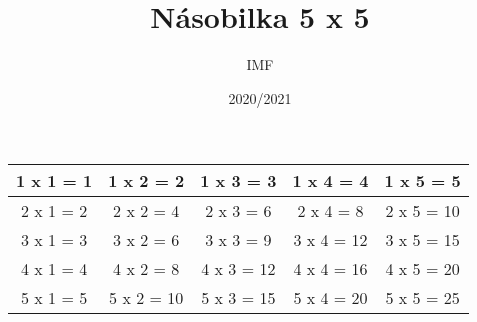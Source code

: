 \documentclass[a4paper,landscape,11pt]{article}
\title{Násobilka 5 x 5}
\author{IMF}
\date{2020/2021}
\begin{document}
\maketitle

\begin{tabular}{|c|c|c|c|c|}
  \hline
  
  
  1 x 1 = 1
  
  &
  
  
  1 x 2 = 2
  
  &
  
  
  1 x 3 = 3
  
  &
  
  
  1 x 4 = 4
  
  &
  
  
  1 x 5 = 5
  
  
  \\ \hline
  
  
  2 x 1 = 2
  
  &
  
  
  2 x 2 = 4
  
  &
  
  
  2 x 3 = 6
  
  &
  
  
  2 x 4 = 8
  
  &
  
  
  2 x 5 = 10
  
  
  \\ \hline
  
  
  3 x 1 = 3
  
  &
  
  
  3 x 2 = 6
  
  &
  
  
  3 x 3 = 9
  
  &
  
  
  3 x 4 = 12
  
  &
  
  
  3 x 5 = 15
  
  
  \\ \hline
  
  
  4 x 1 = 4
  
  &
  
  
  4 x 2 = 8
  
  &
  
  
  4 x 3 = 12
  
  &
  
  
  4 x 4 = 16
  
  &
  
  
  4 x 5 = 20
  
  
  \\ \hline
  
  
  5 x 1 = 5
  
  &
  
  
  5 x 2 = 10
  
  &
  
  
  5 x 3 = 15
  
  &
  
  
  5 x 4 = 20
  
  &
  
  
  5 x 5 = 25
  
  
  \\ \hline
  
\end{tabular}
\end{document}
